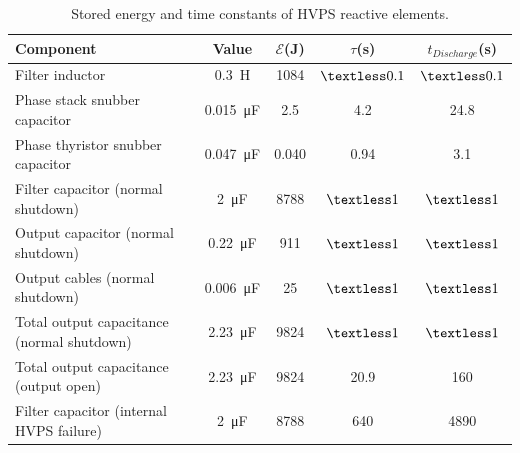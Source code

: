 \documentclass[letterpaper,11pt]{article}
\begin{document}
\begin{table}[hb]
	\begin{center}
		\begin{tabular}{  l  c  c  c  c  }
			\hline
			Component       &  Value   & $\mathcal{E}$(J) & $\tau$(s) & $t_{Discharge}$(s) \rule[-8pt]{0pt}{22pt} \\ \hline
			Filter inductor & \SI{0.3}{\henry} & 1084 & $\textless 0.1$ & $\textless 0.1$ \rule{0pt}{14pt} \\ %
			Phase stack snubber capacitor & \SI{0.015}{\micro\farad} &  2.5  & 4.2 & 24.8 \\ %
			Phase thyristor snubber capacitor & \SI{0.047}{\micro\farad} &  0.040 & 0.94 & 3.1 \\ %
			Filter capacitor (normal shutdown) & \SI{2}{\micro\farad} &  8788 & $\textless 1$ & $\textless 1$ \\ %
			Output capacitor (normal shutdown) & \SI{0.22}{\micro\farad} & 911 & $\textless 1$ & $\textless 1$ \\ %
			Output cables (normal shutdown) & \SI{0.006}{\micro\farad} & 25 & $\textless 1$ & $\textless 1$ \\ %
			Total output capacitance (normal shutdown) & \SI{2.23}{\micro\farad} & 9824 & $\textless 1$ & $\textless 1$ \\ %
			Total output capacitance (output open) & \SI{2.23}{\micro\farad} & 9824 & 20.9 & 160 \\ %
			Filter capacitor (internal HVPS failure) & \SI{2}{\micro\farad} & 8788 & 640 & 4890 \\ \hline
		\end{tabular}
		\caption{Stored energy and time constants of HVPS reactive elements.}\label{tbl:storedEnergy}
	\end{center}
\end{table}



\end{document}
